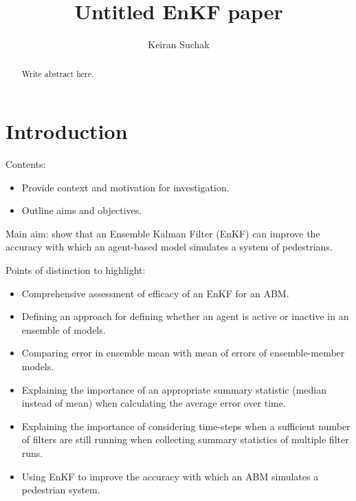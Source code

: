 \documentclass{article}
\title{Untitled EnKF paper}
\author{Keiran Suchak}
\begin{document}
\maketitle{}

\begin{abstract}
    Write abstract here.
\end{abstract}

\section{Introduction}\label{sec:intro}


Contents:
\begin{itemize}
    \item Provide context and motivation for investigation.
    \item Outline aims and objectives.
\end{itemize}

Main aim: show that an Ensemble Kalman Filter (EnKF) can improve the accuracy with which an agent-based model simulates a system of pedestrians.

Points of distinction to highlight:
\begin{itemize}
	\item Comprehensive assessment of efficacy of an EnKF for an ABM.
    \item Defining an approach for defining whether an agent is active or
        inactive in an ensemble of models.
    \item Comparing error in ensemble mean with mean of errors of
        ensemble-member models.
    \item Explaining the importance of an appropriate summary statistic
        (median instead of mean) when calculating the average error over
        time.
    \item Explaining the importance of considering time-steps when a
        sufficient number of filters are still running when collecting
        summary statistics of multiple filter runs.
    \item Using EnKF to improve the accuracy with which an ABM simulates a
        pedestrian system.
\end{itemize}
\end{document}
